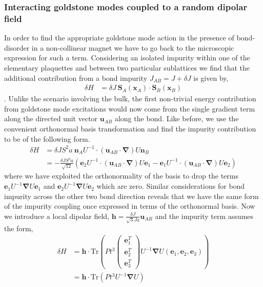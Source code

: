 \documentclass[notitlepage,onecolumn,showpacs,11pt]{revtex4-1}
\newcommand{\mbf}[1]{\mathbf{#1}}
\newcommand{\grad}{\boldsymbol{\nabla}}
\newcommand{\Tr}{\text{Tr}}
\begin{document}
\subsubsection{Interacting goldstone modes coupled to a random dipolar field}

In order to find the appropriate goldstone mode action in the presence of bond-disorder in a 
non-collinear magnet we have to go back to the microscopic expression for such a term. 
Considering an isolated impurity within one of the elementary plaquettes and between two
particular sublattices we find that the additional contribution from a bond impurity 
$J_{AB} = J + \delta J$ is given by,
\begin{equation}
    \begin{aligned}
        \delta H &= \delta J \ \mbf{S}_A(\mbf{x}_A)\cdot\mbf{S}_B(\mbf{x}_B)
    \end{aligned}
\end{equation}
. Unlike the scenario involving the bulk, the first non-trivial energy contribution from
goldstone mode excitations would now come from the single gradient term along the directed
unit vector $\mbf{u}_{AB}$ along the bond. Like before, we use the convenient orthonormal 
basis transformation and find the impurity contribution to be of the following form.
\begin{equation}
    \begin{aligned}
        \delta H &= \delta JS^2a \ \mbf{n}_AU^{-1}\cdot(\mbf{u}_{AB}\cdot\grad)U\mbf{n}_B\\
        &= -\frac{\delta JS^2a}{\sqrt{12}}\left(
        \mbf{e}_2 U^{-1}\cdot(\mbf{u}_{AB}\cdot\grad)U \mbf{e}_1
        -\mbf{e}_1 U^{-1}\cdot(\mbf{u}_{AB}\cdot\grad)U\mbf{e}_2
        \right)
    \end{aligned}
\end{equation}
where we have exploited the orthonormality of the basis to drop the terms $\mbf{e}_1U^{-1}\grad U
\mbf{e}_1$ and $\mbf{e}_2 U^{-1}\grad U\mbf{e}_2$ which are zero. Similar considerations for bond 
impurity across the other two bond direction reveals that we have the same form of the impurity 
coupling once expressed in terms of the orthonormal basis. Now we introduce a local dipolar field,
$\mbf{h}=\frac{\delta J}{\sqrt{3}Ja}\mbf{u}_{AB}$ and the impurity term assumes the form,
\begin{equation}
    \begin{aligned}
        \delta H &= \mbf{h}\cdot\Tr\left(
        Pt^{3}
        \begin{pmatrix}
            \mbf{e}_1^T\\
            \mbf{e}_2^T\\
            \mbf{e}_3^T
        \end{pmatrix}
        U^{-1}
        \grad
        U
        (\mbf{e}_1,\mbf{e}_2,\mbf{e}_3)\right) \\
        &= \mbf{h}\cdot\Tr\left(Pt^3 U^{-1}\grad U\right)
    \end{aligned}
\end{equation}
\end{document}
